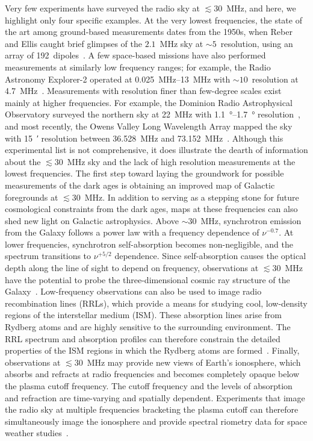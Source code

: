 \documentclass{ws-jai}
\begin{document}
Very few experiments have surveyed the radio sky at $\lesssim 30$~MHz,
and here, we highlight only four specific examples.  At the very
lowest frequencies, the state of the art among ground-based
measurements dates from the 1950s, when Reber and Ellis caught brief
glimpses of the $2.1$~MHz sky at $\sim 5$\degree\ resolution, using an
array of 192~dipoles~\citep{1956JGR....61....1R}.  A few space-based
missions have also performed measurements at similarly low frequency
ranges; for example, the Radio Astronomy Explorer-2 operated at
\SIrange{0.025}{13}{\MHz} with $\sim 10$\degree\ resolution at
\SI{4.7}{\MHz}~\citep{1975A&A....40..365A}.  Measurements with
resolution finer than few-degree scales exist mainly at higher
frequencies.  For example, the Dominion Radio Astrophysical
Observatory surveyed the northern sky at \SI{22}{\MHz} with
\SIrange{1.1}{1.7}{\degree} resolution~\citep{1999A&AS..137....7R},
and most recently, the Owens Valley Long Wavelength Array mapped the
sky with \SI{15}{\arcminute} resolution between 36.528~MHz and
73.152~MHz~\citep{2018AJ....156...32E}.  Although this experimental
list is not comprehensive, it does illustrate the dearth of
information about the $\lesssim 30$~MHz sky and the lack of high
resolution measurements at the lowest frequencies.  The first step
toward laying the groundwork for possible measurements of the dark
ages is obtaining an improved map of Galactic foregrounds at $\lesssim
30$~MHz.  In addition to serving as a stepping stone for future
cosmological constraints from the dark ages, maps at these frequencies
can also shed new light on Galactic astrophysics.  Above $\sim30$~MHz,
synchrotron emission from the Galaxy follows a power law with a
frequency dependence of $\nu^{-0.7}$.  At lower frequencies,
synchrotron self-absorption becomes non-negligible, and the spectrum
transitions to $\nu^{+5/2}$ dependence.  Since self-absorption causes
the optical depth along the line of sight to depend on frequency,
observations at $\lesssim 30$~MHz have the potential to probe the
three-dimensional cosmic ray structure of the
Galaxy~\citep{2002ApJ...575..217P}.  Low-frequency observations can
also be used to image radio recombination lines (RRLs), which provide
a means for studying cool, low-density regions of the interstellar
medium (ISM).  These absorption lines arise from Rydberg atoms and are
highly sensitive to the surrounding environment.  The RRL spectrum and
absorption profiles can therefore constrain the detailed properties of
the ISM regions in which the Rydberg atoms are
formed~\citep{2009NewAR..53..259G, 2007MNRAS.374..852S}.  Finally,
observations at $\lesssim30$~MHz may provide new views of Earth's
ionosphere, which absorbs and refracts at radio frequencies and
becomes completely opaque below the plasma cutoff frequency.  The
cutoff frequency and the levels of absorption and refraction are
time-varying and spatially dependent.  Experiments that image the
radio sky at multiple frequencies bracketing the plasma cutoff can
therefore simultaneously image the ionosphere and provide spectral
riometry data for space weather studies~\citep{2014GeoRL..41.5370K}.
\end{document}
